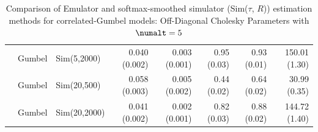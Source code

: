 \begin{table}[htbp]
\begin{tabular}{@{}rllrrrrr@{}}
 & Gumbel & Sim(5,2000) & 0.040 (0.002) & 0.003 (0.001) & 0.95 (0.03) & 0.93 (0.01) & 150.01 (1.30) \\
 & Gumbel & Sim(20,500) & 0.058 (0.003) & 0.005 (0.002) & 0.44 (0.02) & 0.64 (0.02) & 30.99 (0.35) \\
 & Gumbel & Sim(20,2000) & 0.041 (0.002) & 0.002 (0.001) & 0.82 (0.03) & 0.88 (0.02) & 144.72 (1.40) \\
\bottomrule
\end{tabular}
\caption{Comparison of Emulator and softmax-smoothed simulator (Sim($\tau$, $R$)) estimation methods for correlated-Gumbel models: Off-Diagonal Cholesky Parameters with $\numalt=5$}
\label{tab:emulator_vs_sim_gumbel:5:llower}
\end{table}